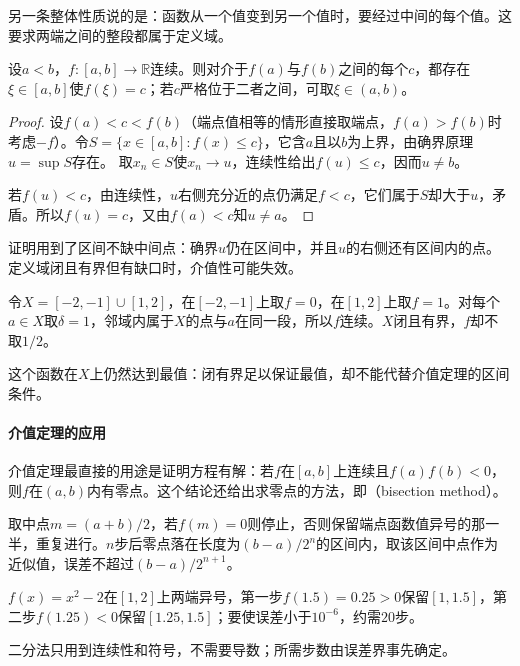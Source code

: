另一条整体性质说的是：函数从一个值变到另一个值时，要经过中间的每个值。这要求两端之间的整段都属于定义域。
\begin{theorem}[介值定理]
\label{thm:analysis-intermediate-value}
设$a<b$，$f:[a,b]\to\mathbb R$连续。则对介于$f(a)$与$f(b)$之间的每个$c$，都存在$\xi\in[a,b]$使$f(\xi)=c$；若$c$严格位于二者之间，可取$\xi\in(a,b)$。
\end{theorem}
\begin{proof}
设$f(a)<c<f(b)$（端点值相等的情形直接取端点，$f(a)>f(b)$时考虑$-f$）。令$S=\{x\in[a,b]:f(x)\leq c\}$，它含$a$且以$b$为上界，由确界原理$u=\sup S$存在。
取$x_n\in S$使$x_n\to u$，连续性给出$f(u)\leq c$，因而$u\neq b$。

若$f(u)<c$，由连续性，$u$右侧充分近的点仍满足$f<c$，它们属于$S$却大于$u$，矛盾。所以$f(u)=c$，又由$f(a)<c$知$u\neq a$。
\end{proof}
证明用到了区间不缺中间点：确界$u$仍在区间中，并且$u$的右侧还有区间内的点。定义域闭且有界但有缺口时，介值性可能失效。
\begin{example}[有缺口的定义域上不取中间值]
\label{ex:analysis-intermediate-value-gap}
令$X=[-2,-1]\cup[1,2]$，在$[-2,-1]$上取$f=0$，在$[1,2]$上取$f=1$。对每个$a\in X$取$\delta=1$，邻域内属于$X$的点与$a$在同一段，所以$f$连续。$X$闭且有界，$f$却不取$1/2$。
\end{example}
这个函数在$X$上仍然达到最值：闭有界足以保证最值，却不能代替介值定理的区间条件。

\paragraph{介值定理的应用}
介值定理最直接的用途是证明方程有解：若$f$在$[a,b]$上连续且$f(a)f(b)<0$，则$f$在$(a,b)$内有零点。这个结论还给出求零点的方法，即（bisection method）。

取中点$m=(a+b)/2$，若$f(m)=0$则停止，否则保留端点函数值异号的那一半，重复进行。$n$步后零点落在长度为$(b-a)/2^n$的区间内，取该区间中点作为近似值，误差不超过$(b-a)/2^{n+1}$。
\begin{example}
\label{ex:ru-bisection-sqrt2}
$f(x)=x^2-2$在$[1,2]$上两端异号，第一步$f(1.5)=0.25>0$保留$[1,1.5]$，第二步$f(1.25)<0$保留$[1.25,1.5]$；要使误差小于$10^{-6}$，约需$20$步。
\end{example}
二分法只用到连续性和符号，不需要导数；所需步数由误差界事先确定。

